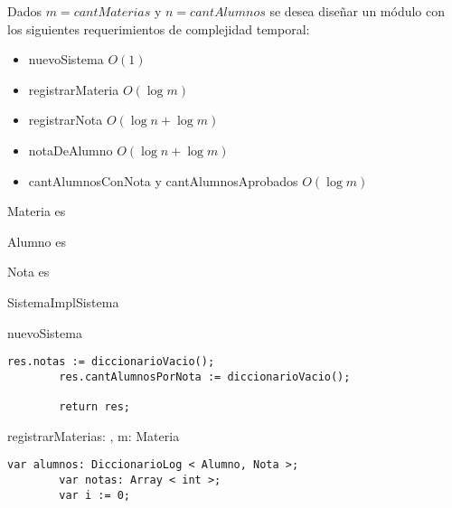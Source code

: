 Dados $m = cantMaterias$ y $n = cantAlumnos$ se desea diseñar un módulo con los siguientes requerimientos de complejidad temporal:
\begin{itemize}
	\item nuevoSistema $O(1)$
	\item registrarMateria $O(\log m)$
	\item registrarNota $O(\log n + \log m)$
	\item notaDeAlumno $O(\log n + \log m)$
	\item cantAlumnosConNota y cantAlumnosAprobados $O(\log m)$
\end{itemize}

Materia es \str

Alumno es \str

Nota es \Int

\begin{module}{SistemaImpl}{}{Sistema}{}
	\bigskip




	\begin{proc}{nuevoSistema}{}{\moduletype}
		\begin{lstlisting}[numbers=none,frame=none]
		res.notas := diccionarioVacio();
		res.cantAlumnosPorNota := diccionarioVacio();

		return res;
		\end{lstlisting}
	\end{proc}

	\begin{proc}{registrarMateria}{\Inout s: \moduletype, \In m: Materia}{}
		\begin{lstlisting}[numbers=none,frame=none]
		var alumnos: DiccionarioLog < Alumno, Nota >;
		var notas: Array < int >;
		var i := 0;


\end{lstlisting}
\end{proc}
\end{module}

